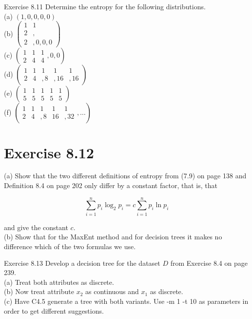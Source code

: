\documentclass[10pt]{article}
\begin{document}
Exercise 8.11 Determine the entropy for the following distributions.\\
(a) $(1,0,0,0,0)$\\
(b) $\left(\begin{array}{ll}1 & 1 \\ 2 & , \\ 2 & , 0,0,0\end{array}\right)$\\
(c) $\left(\begin{array}{ccc}1 & 1 & 1 \\ 2 & 4 & 4\end{array}, 0,0\right)$\\
(d) $\left(\begin{array}{ccccc}1 & 1 & 1 & 1 & 1 \\ 2 & 4 & , 8 & , 16 & , 16\end{array}\right)$\\
(e) $\left(\begin{array}{ccccc}1 & 1 & 1 & 1 & 1 \\ 5 & 5 & 5 & 5 & 5\end{array}\right)$\\
(f) $\left(\begin{array}{ccccc}1 & 1 & 1 & 1 & 1 \\ 2 & 4 & , 8 & 16 & , 32\end{array}, \ldots\right)$

\section*{Exercise 8.12}
(a) Show that the two different definitions of entropy from (7.9) on page 138 and Definition 8.4 on page 202 only differ by a constant factor, that is, that

$$
\sum_{i=1}^{n} p_{i} \log _{2} p_{i}=c \sum_{i=1}^{n} p_{i} \ln p_{i}
$$

and give the constant $c$.\\
(b) Show that for the MaxEnt method and for decision trees it makes no difference which of the two formulas we use.

Exercise 8.13 Develop a decision tree for the dataset $D$ from Exercise 8.4 on page 239.\\
(a) Treat both attributes as discrete.\\
(b) Now treat attribute $x_{2}$ as continuous and $x_{1}$ as discrete.\\
(c) Have C4.5 generate a tree with both variants. Use -m 1 -t 10 as parameters in order to get different suggestions.
\end{document}
